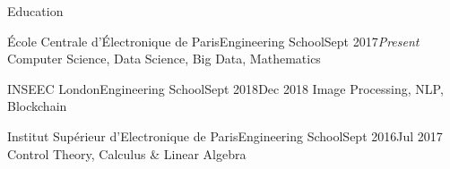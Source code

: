 \documentclass{resume}
\begin{document}
    \begin{rSection}{Education}
        \begin{school}{École Centrale d'Électronique de Paris}{Engineering School}{Sept 2017}{\em Present}{
            Computer Science, Data Science, Big Data, Mathematics
        }
        \end{school}

        \begin{school}{INSEEC London}{Engineering School}{Sept 2018}{Dec 2018}{
            Image Processing, NLP, Blockchain
        }
        \end{school}

        \begin{school}{Institut Supérieur d'Electronique de Paris}{Engineering School}{Sept 2016}{Jul 2017}{
            Control Theory, Calculus \& Linear Algebra
        }
        \end{school}
    \end{rSection}
\end{document}
